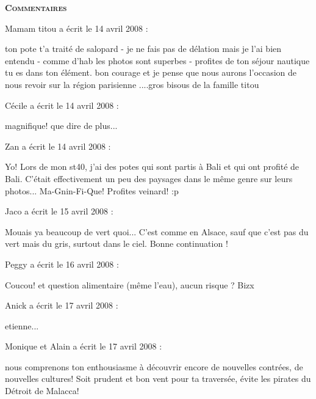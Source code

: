 \bigskip
\textbf{\textsc{Commentaires}}

 \medskip
Mamam titou a écrit le 14 avril 2008 :
\begin{displayquote}
ton pote t'a traité de salopard - je ne fais pas de  délation mais je l'ai bien entendu - comme d'hab les photos sont superbes - profites de ton séjour nautique tu es dans ton élément. bon courage et je pense que nous aurons l'occasion de nous revoir sur la région parisienne ....gros bisous de la famille titou
\end{displayquote}

 \medskip
Cécile a écrit le 14 avril 2008 :
\begin{displayquote}
magnifique! que dire de plus...
\end{displayquote}

 \medskip
Zan a écrit le 14 avril 2008 :
\begin{displayquote}
Yo!
Lors de mon st40, j'ai des potes qui sont partis à Bali et qui ont profité de Bali. C'était effectivement un peu des paysages dans le même genre sur leurs photos... Ma-Gnin-Fi-Que!
Profites veinard! :p
\end{displayquote}

 \medskip
Jaco a écrit le 15 avril 2008 :
\begin{displayquote}
Mouais ya beaucoup de vert quoi... C'est comme en Alsace, sauf que c'est pas du vert mais du gris, surtout dans le ciel.
Bonne continuation !
\end{displayquote}

 \medskip
Peggy a écrit le 16 avril 2008 :
\begin{displayquote}
Coucou!
et question alimentaire (même l'eau), aucun risque ?
Bizx
\end{displayquote}

 \medskip
Anick a écrit le 17 avril 2008 :
\begin{displayquote}
etienne...
\end{displayquote}

 \medskip
Monique et Alain a écrit le 17 avril 2008 :
\begin{displayquote}
nous comprenons ton enthousiasme à découvrir encore de nouvelles contrées, de nouvelles cultures! Soit prudent et bon vent pour ta traversée, évite les pirates du Détroit de Malacca!
\end{displayquote}

